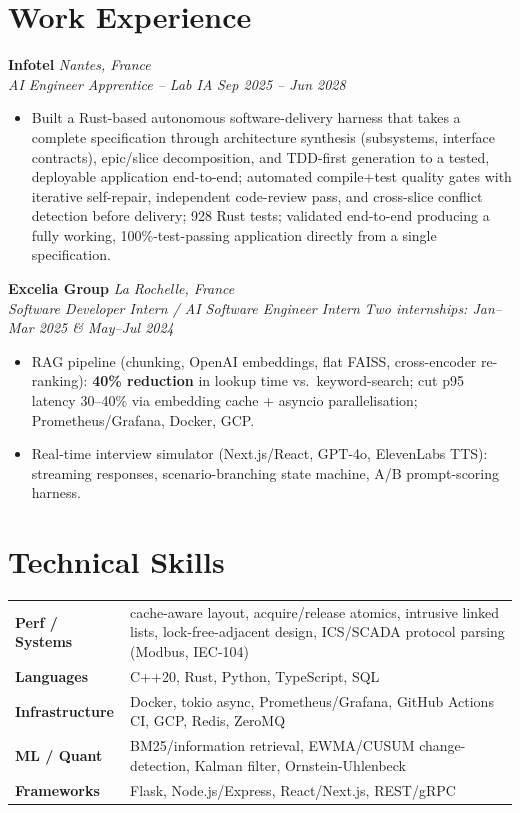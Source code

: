\documentclass[10pt]{article}
\newcommand{\entry}[4]{%
  \noindent\textbf{#1} \hfill \textit{#2} \\
  \textit{#3} \hfill \textit{#4}\\[-0.3em]
}
\begin{document}
\section*{Work Experience}
\entry{Infotel}{Nantes, France}{AI Engineer Apprentice -- Lab IA}{Sep 2025 -- Jun 2028}
\begin{itemize}
  \item Built a Rust-based autonomous software-delivery harness that takes a complete specification through architecture synthesis (subsystems, interface contracts), epic/slice decomposition, and TDD-first generation to a tested, deployable application end-to-end; automated compile+test quality gates with iterative self-repair, independent code-review pass, and cross-slice conflict detection before delivery; 928 Rust tests; validated end-to-end producing a fully working, 100\%-test-passing application directly from a single specification.
\end{itemize}
\entry{Excelia Group}{La Rochelle, France}{Software Developer Intern / AI Software Engineer Intern}{Two internships: Jan--Mar 2025 \& May--Jul 2024}
\begin{itemize}
  \item RAG pipeline (chunking, OpenAI embeddings, flat FAISS, cross-encoder re-ranking): \textbf{40\% reduction} in lookup time vs.\ keyword-search; cut p95 latency 30--40\% via embedding cache + asyncio parallelisation; Prometheus/Grafana, Docker, GCP.
  \item Real-time interview simulator (Next.js/React, GPT-4o, ElevenLabs TTS): streaming responses, scenario-branching state machine, A/B prompt-scoring harness.
\end{itemize}

\section*{Technical Skills}
\noindent
\begin{tabular}{@{}p{2.7cm}p{15.5cm}@{}}
\textbf{Perf / Systems} & cache-aware layout, acquire/release atomics, intrusive linked lists, lock-free-adjacent design, ICS/SCADA protocol parsing (Modbus, IEC-104) \\
\textbf{Languages} & C++20, Rust, Python, TypeScript, SQL \\
\textbf{Infrastructure} & Docker, tokio async, Prometheus/Grafana, GitHub Actions CI, GCP, Redis, ZeroMQ \\
\textbf{ML / Quant} & BM25/information retrieval, EWMA/CUSUM change-detection, Kalman filter, Ornstein-Uhlenbeck \\
\textbf{Frameworks} & Flask, Node.js/Express, React/Next.js, REST/gRPC \\
\end{tabular}
\end{document}
